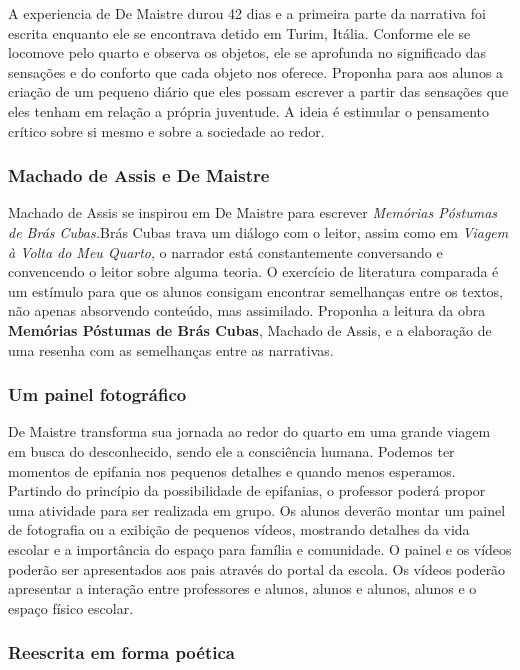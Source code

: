 \documentclass[12pt]{extarticle}
\begin{document}
A experiencia de De Maistre durou 42 dias e a primeira parte da
narrativa foi escrita enquanto ele se encontrava detido em Turim,
Itália. Conforme ele se locomove pelo quarto e observa os objetos, ele
se aprofunda no significado das sensações e do conforto que cada
objeto nos oferece. Proponha para aos alunos a criação de um pequeno
diário que eles possam escrever a partir das sensações que eles tenham
em relação a própria juventude. A ideia é estimular o pensamento
crítico sobre si mesmo e sobre a sociedade ao redor.


\subsubsection{Machado de Assis e De Maistre}

Machado de Assis se inspirou em De Maistre para escrever
\emph{Memórias Póstumas de Brás Cubas.}Brás Cubas trava um diálogo com
o leitor, assim como em \emph{Viagem à Volta do Meu Quarto}, o
narrador está constantemente conversando e convencendo o leitor sobre
alguma teoria. O exercício de literatura comparada é um estímulo para
que os alunos consigam encontrar semelhanças entre os textos, não
apenas absorvendo conteúdo, mas assimilado. Proponha a leitura da obra
\textbf{Memórias Póstumas de Brás Cubas}, Machado de Assis, e a
elaboração de uma resenha com as semelhanças entre as narrativas.

\subsubsection{Um painel fotográfico}


De Maistre transforma sua jornada ao redor do quarto em uma grande
viagem em busca do desconhecido, sendo ele a consciência humana.
Podemos ter momentos de epifania nos pequenos detalhes e quando menos
esperamos. Partindo do princípio da possibilidade de epifanias, o
professor poderá propor uma atividade para ser realizada em grupo. Os
alunos deverão montar um painel de fotografia ou a exibição de
pequenos vídeos, mostrando detalhes da vida escolar e a importância do
espaço para família e comunidade. O painel e os vídeos poderão ser
apresentados aos pais através do portal da escola. Os vídeos poderão
apresentar a interação entre professores e alunos, alunos e alunos,
alunos e o espaço físico escolar.

\subsubsection{Reescrita em forma poética}
\end{document}
